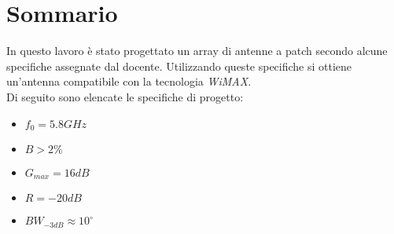 
\markright{}
\section*{Sommario}
In questo lavoro è stato progettato un array di antenne a patch secondo alcune specifiche assegnate dal docente. Utilizzando queste specifiche si ottiene un'antenna compatibile con la tecnologia \emph{WiMAX}. \\
Di seguito sono elencate le specifiche di progetto:
\begin{itemize}
\item $f_{0} = 5.8 GHz$
\item $B > 2\% $
\item $G_{max} = 16 dB $
\item $R = -20 dB $
\item $BW_{-3dB} \approx 10^\circ $
\end{itemize}
\newpage